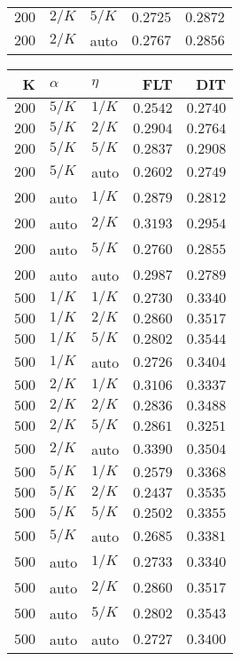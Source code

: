 \begin{table}
\begin{spacing}{1.2}
{\begin{tabular}{rll|rr}
$200$ &  $2/K$ &  $5/K$ &         $0.2725$ & $0.2872$ \\
$200$ &  $2/K$ &   auto &         $0.2767$ & $0.2856$ \\
\bottomrule
\end{tabular}
} \hfill \parbox{.45\linewidth}{\centering \begin{tabular}{rll|rr}
\toprule
    K &  $\alpha$ &    $\eta$ & FLT &        DIT \\
\midrule
$200$ &  $5/K$ &  $1/K$ &         $0.2542$ &      $0.2740$ \\
$200$ &  $5/K$ &  $2/K$ &         $0.2904$ &      $0.2764$ \\
$200$ &  $5/K$ &  $5/K$ &         $0.2837$ &      $0.2908$ \\
$200$ &  $5/K$ &   auto &         $0.2602$ &      $0.2749$ \\
$200$ &   auto &  $1/K$ &         $0.2879$ &      $0.2812$ \\
$200$ &   auto &  $2/K$ &         $0.3193$ &      $0.2954$ \\
$200$ &   auto &  $5/K$ &         $0.2760$ &      $0.2855$ \\
$200$ &   auto &   auto &         $0.2987$ &      $0.2789$ \\
$500$ &  $1/K$ &  $1/K$ &         $0.2730$ &      $0.3340$ \\
$500$ &  $1/K$ &  $2/K$ &         $0.2860$ &      $0.3517$ \\
$500$ &  $1/K$ &  $5/K$ &         $0.2802$ & $\bm{0.3544}$ \\
$500$ &  $1/K$ &   auto &         $0.2726$ &      $0.3404$ \\
$500$ &  $2/K$ &  $1/K$ &         $0.3106$ &      $0.3337$ \\
$500$ &  $2/K$ &  $2/K$ &         $0.2836$ &      $0.3488$ \\
$500$ &  $2/K$ &  $5/K$ &         $0.2861$ &      $0.3251$ \\
$500$ &  $2/K$ &   auto &    $\bm{0.3390}$ &      $0.3504$ \\
$500$ &  $5/K$ &  $1/K$ &         $0.2579$ &      $0.3368$ \\
$500$ &  $5/K$ &  $2/K$ &         $0.2437$ &      $0.3535$ \\
$500$ &  $5/K$ &  $5/K$ &         $0.2502$ &      $0.3355$ \\
$500$ &  $5/K$ &   auto &         $0.2685$ &      $0.3381$ \\
$500$ &   auto &  $1/K$ &         $0.2733$ &      $0.3340$ \\
$500$ &   auto &  $2/K$ &         $0.2860$ &      $0.3517$ \\
$500$ &   auto &  $5/K$ &         $0.2802$ &      $0.3543$ \\
$500$ &   auto &   auto &         $0.2727$ &      $0.3400$ \\
\bottomrule
\end{tabular}
}
\end{spacing}
\end{table}
